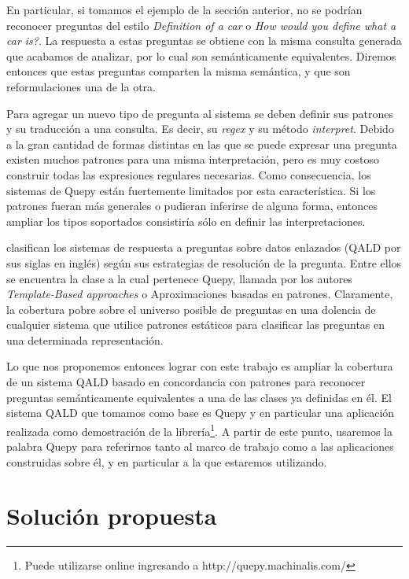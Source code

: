 En particular, si tomamos el ejemplo de la sección anterior, no se podrían reconocer preguntas del estilo \textit{Definition of a car} o \textit{How would you define what a car is?}. La respuesta a estas preguntas se obtiene con la misma consulta generada que acabamos de analizar, por lo cual son semánticamente equivalentes. Diremos entonces que estas preguntas comparten la misma semántica, y que son reformulaciones una de la otra.

Para agregar un nuevo tipo de pregunta al sistema se deben definir sus patrones y su traducción a una consulta. Es decir, su \textit{regex} y su método \textit{interpret}. Debido a la gran cantidad de formas distintas en las que se puede expresar una pregunta existen muchos patrones para una misma interpretación, pero es muy costoso construir todas las expresiones regulares necesarias. Como consecuencia, los sistemas de Quepy están fuertemente limitados por esta característica. Si los patrones fueran más generales o pudieran inferirse de alguna forma, entonces ampliar los tipos soportados consistiría sólo en definir las interpretaciones.

\citet{ungerQALD} clasifican los sistemas de respuesta a preguntas sobre datos enlazados (QALD por sus siglas en inglés) según sus estrategias de resolución de la pregunta. Entre ellos se encuentra la clase a la cual pertenece Quepy, llamada por los autores \textit{Template-Based approaches} o Aproximaciones basadas en patrones. Claramente, la cobertura pobre sobre el universo posible de preguntas en una dolencia de cualquier sistema que utilice patrones estáticos para clasificar las preguntas en una determinada representación.

Lo que nos proponemos entonces lograr con este trabajo es ampliar la cobertura de un sistema QALD basado en concordancia con patrones para reconocer preguntas semánticamente equivalentes a una de las clases ya definidas en él. El sistema QALD que tomamos como base es Quepy y en particular una aplicación realizada como demostración de la librería\footnote{Puede utilizarse online ingresando a http://quepy.machinalis.com/}. A partir de este punto, usaremos la palabra Quepy para referirnos tanto al marco de trabajo como a las aplicaciones construidas sobre él, y en particular a la que estaremos utilizando.

\section{Solución propuesta}

